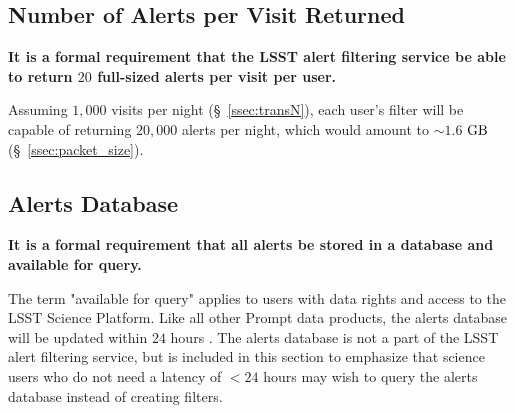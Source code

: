 \documentclass[DM,authoryear,toc]{lsstdoc}
\begin{document}
\subsection{Number of Alerts per Visit Returned}\label{ssec:LAFS_returns}

{\bf It is a formal requirement that the LSST alert filtering service be able to return $20$ full-sized alerts per visit per user.}

Assuming $1,000$ visits per night (\S~\ref{ssec:transN}), each user's filter will be capable of returning $20,000$ alerts per night, which would amount to $\sim1.6$ $\rm GB$ (\S~\ref{ssec:packet_size}).



\subsection{Alerts Database}\label{ssec:LAFS_adb}

{\bf It is a formal requirement that all alerts be stored in a database and available for query.}

The term "available for query" applies to users with data rights and access to the LSST Science Platform. Like all other Prompt data products, the alerts database will be updated within $24$ hours . The alerts database is not a part of the LSST alert filtering service, but is included in this section to emphasize that science users who do not need a latency of $<24$ hours may wish to query the alerts database instead of creating filters.





\end{document}
